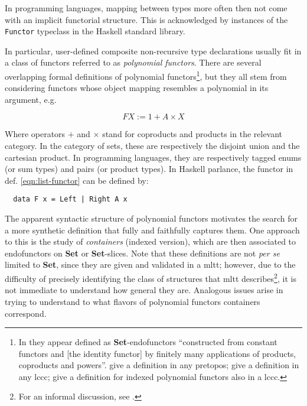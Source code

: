 \documentclass[a4paper]{article}
\newcommand{\catname}[1]{{\normalfont\textbf{#1}}}
\newcommand{\Set}{\catname{Set}}
\begin{document}
In programming languages, mapping between types more often then not come with an implicit functorial structure. This is acknowledged by instances of the \texttt{Functor} typeclass in the Haskell standard library.

In particular, user-defined composite non-recursive type declarations usually fit in a class of functors referred to as \textit{polynomial functors}. There are several overlapping formal definitions of polynomial functors\footnote{In \textcite{Goldblatt2001} they appear defined as \Set{}-endofunctors ``constructed from constant functors and [the identity functor] by finitely many applications of products, coproducts and powers''. \textcite{Moerdijk2000} give a definition in any pretopos; \textcite{Gambino2004} give a definition in any \gls{lccc}; \textcite{Gambino2009} give a definition for indexed polynomial functors also in a \gls{lccc}.}, but they all stem from considering functors whose object mapping resembles a polynomial in its argument, e.g.

\begin{equation}
	\label{eqn:list-functor}
	F X := 1 + A \times X
\end{equation}

Where operators \(+\) and \(\times\) stand for coproducts and products in the relevant category. In the category of sets, these are respectively the disjoint union and the cartesian product. In programming languages, they are respectively tagged enums (or sum types) and pairs (or product types). In Haskell parlance, the functor in def. \ref{eqn:list-functor} can be defined by:

\begin{lstlisting}
  data F x = Left | Right A x 
\end{lstlisting}

The apparent syntactic structure of polynomial functors motivates the search for a more synthetic definition that fully and faithfully captures them. One approach to this is the study of \textit{containers} \cite{Abbott2003}\cite{Abbott2005}\cite{Altenkirch2015}(indexed version), which are then associated to endofunctors on \Set{} or \Set{}-slices. Note that these definitions are not \textit{per se} limited to \Set{}, since they are given and validated in a \gls{mltt}; however, due to the difficulty of precisely identifying the class of structures that \gls{mltt} describes\footnote{For an informal discussion, see \cite{Voevodsky2015}.}, it is not immediate to understand how general they are. Analogous issues arise in trying to understand to what flavors of polynomial functors containers correspond.
\end{document}
